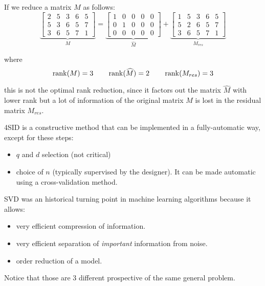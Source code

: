 \begin{example}
    
    If we reduce a matrix $M$ as follows: 
    \[
        \underbrace{\begin{bmatrix}
            2 & 5 & 3 & 6 & 5 \\
            5 & 3 & 6 & 5 & 7 \\
            3 & 6 & 5 & 7 & 1
        \end{bmatrix}}_{M}
        =
        \underbrace{\begin{bmatrix}
            1 & 0 & 0 & 0 & 0 \\
            0 & 1 & 0 & 0 & 0 \\
            0 & 0 & 0 & 0 & 0
        \end{bmatrix}}_{\hat{M}}
        +
        \underbrace{
        \begin{bmatrix}
            1 & 5 & 3 & 6 & 5 \\
            5 & 2 & 6 & 5 & 7 \\
            3 & 6 & 5 & 7 & 1
        \end{bmatrix}}_{M_{res}}
    \]

    where
    \[ \operatorname*{rank}(M) = 3 \qquad \operatorname*{rank}(\widehat{M}) = 2 \qquad \operatorname*{rank}(M_{res}) = 3 \]

    this is not the optimal rank reduction, since it factors out the matrix $\hat{M}$ with lower rank but a lot of information of the original matrix $M$ is lost in the residual matrix $M_{res}$.
\end{example}


\begin{remark}
    4SID is a constructive method that can be implemented in a fully-automatic way, except for these steps:
    \begin{itemize}
        \item $q$ and $d$ selection (not critical)
        \item choice of $n$ (typically supervised by the designer). It can be made automatic using a cross-validation method.
    \end{itemize}
\end{remark}

\begin{remark}
    SVD was an historical turning point in machine learning algorithms because it allows:
    \begin{itemize}
        \item very efficient compression of information.
        \item very efficient separation of \emph{important} information from noise.
        \item order reduction of a model.
    \end{itemize}
    Notice that those are 3 different prospective of the same general problem.
\end{remark}
